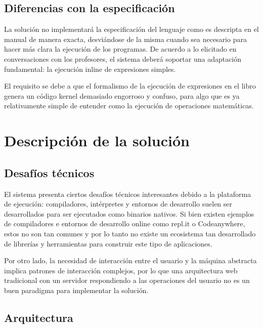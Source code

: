 \documentclass[a4paper,11pt]{article}
\begin{document}
 
\subsection{Diferencias con la especificación}

La solución no implementará la especificación del lenguaje como es descripta en el manual de manera exacta, desviándose de la misma cuando sea necesario para hacer más clara la ejecución de los programas. De acuerdo a lo elicitado en conversaciones con los profesores, el sistema deberá soportar una adaptación fundamental: la ejecución inline de expresiones simples.

El requisito se debe a que el formalismo de la ejecución de expresiones en el libro genera un código kernel demasiado engorroso y confuso, para algo que es ya relativamente simple de entender como la ejecución de operaciones matemáticas.

\section{Descripción de la solución}

\subsection{Desafíos técnicos}

El sistema presenta ciertos desafíos técnicos interesantes debido a la plataforma de ejecución: compiladores, intérpretes y entornos de desarrollo suelen ser desarrollados para ser ejecutados como binarios nativos. Si bien existen ejemplos de compiladores e entornos de desarrollo online como repl.it\cite{replit} o Codeanywhere\cite{codeanywhere}, estos no son tan comunes y por lo tanto no existe un ecosistema tan desarrollado de librerías y herramientas para construir este tipo de aplicaciones.

Por otro lado, la necesidad de interacción entre el usuario y la máquina abstracta implica patrones de interacción complejos, por lo que una arquitectura web tradicional con un servidor respondiendo a las operaciones del usuario no es un buen paradigma para implementar la solución.

\subsection{Arquitectura}
\end{document}
